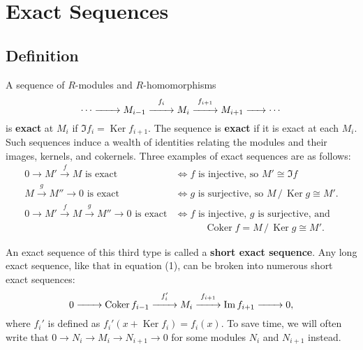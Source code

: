 \documentclass[11pt]{article}
\newcommand{\Ker}{\operatorname{Ker}}
\newcommand{\Coker}{\operatorname{Coker}}
\renewcommand{\longrightarrow}{\xrightarrow{\hspace*{0.7cm}}}
\begin{document}
\newpage


\section{Exact Sequences}


\subsection{Definition}

A sequence of $R$-modules and $R$-homomorphisms
\begin{equation}
	\cdots \longrightarrow M_{i - 1} \stackrel{f_{i}}{\longrightarrow} M_{i} \stackrel{f_{i + 1}}{\longrightarrow} M_{i + 1} \xrightarrow{\hspace*{0.5cm}} \cdots 
\end{equation}
is \textbf{exact} at $M_{i}$ if $\Im f_{i} = \Ker f_{i + 1}$. The sequence is \textbf{exact} if it is exact at each $M_{i}$. Such sequences induce a wealth of identities relating the modules and their images, kernels, and cokernels. Three examples of exact sequences are as follows:
\begin{align*}
	0 \to M' \stackrel{f}{\to} M \text{ is exact } &\iff \text{$f$ is injective, so $M' \cong \Im f$} \\
	M \stackrel{g}{\to} M'' \to 0 \text{ is exact } &\iff \text{$g$ is surjective, so $M \,/\, \Ker g \cong M'$.} \\
	0 \to M' \stackrel{f}{\to} M \stackrel{g}{\to} M'' \to 0 \text{ is exact} &\iff \text{$f$ is injective, $g$ is surjective, and} \\
	& \quad \qquad \text{$\Coker f = M \,/\, \Ker g \cong M'$}.
\end{align*}

An exact sequence of this third type is called a \textbf{short exact sequence}. Any long exact sequence, like that in equation (1), can be broken into numerous short exact sequences:
\[
	0 \longrightarrow \Coker f_{i - 1} \stackrel{f_{i}'}{\longrightarrow} M_{i} \stackrel{f_{i + 1}}{\longrightarrow} \Im f_{i + 1} \longrightarrow 0,
\]
where $f_{i}'$ is defined as $f_{i}'(x + \Ker f_{i}) = f_{i}(x)$. To save time, we will often write that $0 \to N_{i} \to M_{i} \to N_{i + 1} \to 0$ for some modules $N_{i}$ and $N_{i + 1}$ instead.

\end{document}
